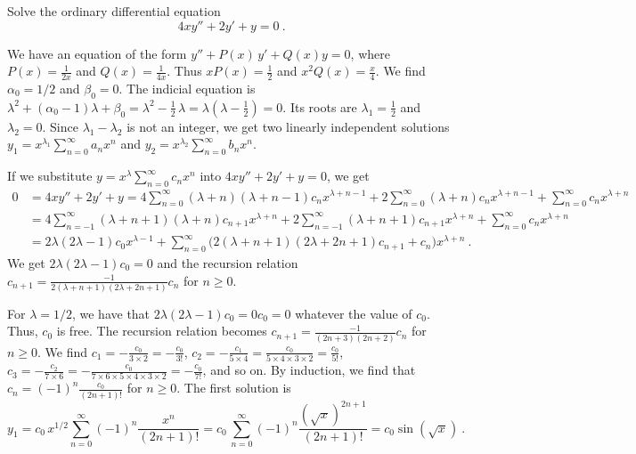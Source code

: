 \begin{egg}
Solve the ordinary differential equation
\[
4xy''+ 2 y' + y = 0 \ .
\]

We have an equation of the form
$\displaystyle y'' + P(x)\, y' + Q(x) y = 0$, where
$\displaystyle P(x) = \frac{1}{2x}$ and
$\displaystyle Q(x) = \frac{1}{4x}$.
Thus $\displaystyle x P(x) = \frac{1}{2}$ and
$\displaystyle x^2 Q(x) = \frac{x}{4}$.  We find
$\alpha_0 = 1/2$ and $\beta_0= 0$.  The indicial equation is
$\displaystyle \lambda^2 + (\alpha_0 - 1)\lambda + \beta_0 = \lambda^2
-\frac{1}{2}\,\lambda  = \lambda \left(\lambda -\frac{1}{2}\right) = 0$.
Its roots are $\displaystyle \lambda_1 = \frac{1}{2}$ and $\lambda_2=0$.
Since $\lambda_1-\lambda_2$ is not an integer, we get two linearly
independent solutions
$\displaystyle y_1 = x^{\lambda_1} \sum_{n=0}^\infty a_n x^n$
and $\displaystyle y_2 = x^{\lambda_2} \sum_{n=0}^\infty b_n x^n$.

If we substitute $\displaystyle y = x^\lambda \sum_{n=0}^\infty c_n x^n$ into
$\displaystyle 4xy''+ 2 y' + y = 0$, we get
\begin{align*}
0 & = 4xy''+ 2 y' + y
= 4 \sum_{n=0}^\infty (\lambda+n)(\lambda+n-1) c_n
x^{\lambda+n-1} + 2 \sum_{n=0}^\infty (\lambda + n )c_n x^{\lambda+n-1}
+ \sum_{n=0}^\infty c_n x^{\lambda+n} \\
&= 4 \sum_{n=-1}^\infty (\lambda+n+1)(\lambda+n) c_{n+1}
x^{\lambda+n} + 2 \sum_{n=-1}^\infty (\lambda + n+1 )c_{n+1} x^{\lambda+n}
+ \sum_{n=0}^\infty c_n x^{\lambda+n} \\
&=  2\lambda(2\lambda-1) c_0 x^{\lambda-1} + \sum_{n=0}^\infty \big(
2(\lambda+n+1)(2\lambda+2n +1)c_{n+1} +c_n\big) x^{\lambda+n} \ .
\end{align*}
We get $2\lambda( 2\lambda -1)c_0 = 0$ and the recursion relation
$\displaystyle c_{n+1} = \frac{-1}{2(\lambda+n+1)(2\lambda+2n+1)} c_n$
for $n\geq 0$.

For $\lambda = 1/2$, we have that
$\displaystyle 2\lambda( 2\lambda -1)c_0 = 0 c_0 = 0$ whatever the
value of $c_0$.  Thus, $c_0$ is free.  The recursion relation becomes
$\displaystyle c_{n+1} = \frac{-1}{(2n+3)(2n+2)} c_n$
for $n \geq 0$.  We find
$\displaystyle c_1 = -\frac{c_0}{3\times 2} = - \frac{c_0}{3!}$,
$\displaystyle c_2 = - \frac{c_1}{5\times 4}
= \frac{c_0}{5\times 4 \times 3 \times 2} = \frac{c_0}{5!}$,
$\displaystyle c_3 = - \frac{c_2}{7\times 6}
= -\frac{c_0}{7\times 6\times 5\times 4 \times 3 \times 2} = - \frac{c_0}{7!}$,
and so on.  By induction, we find that
$\displaystyle c_n = (-1)^n \frac{c_0}{(2n+1)!}$ for $n \geq 0$.
The first solution is
\[
y_1 = c_0 \, x^{1/2} \sum_{n=0}^\infty (-1)^n \frac{x^n}{(2n+1)!}
= c_0 \, \sum_{n=0}^\infty (-1)^n \frac{(\sqrt{x})^{2n+1}}{(2n+1)!}
= c_0 \sin(\sqrt{x}) \ .
\]


\end{egg}
